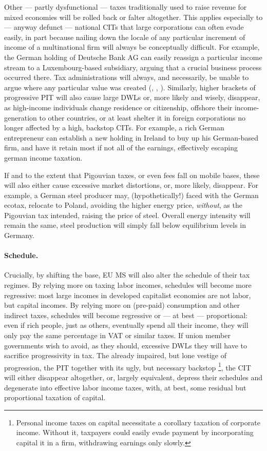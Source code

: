 \documentclass[11pt,a4paper,oneside]{article}
\begin{document}
Other --- partly dysfunctional --- taxes traditionally used to raise revenue for mixed economies will be rolled back or falter altogether.
This applies especially to --- anyway defunct --- national \glspl{CIT} that large corporations can often evade easily, in part because nailing down the locale of any particular increment of income of a multinational firm will always be conceptually difficult.
For example, the German holding of Deutsche Bank AG can easily reassign a particular income stream to a Luxembourg-based subsidiary, arguing that a crucial business process occurred there.
Tax administrations will always, and necessarily, be unable to argue where any particular value was created (\citealt{Ganghof2006}, \citealt{Ganghof}, \citealt[5]{Ganghof2007}).
Similarly, higher brackets of progressive \gls{PIT} will also cause large \glspl{DWL} or, more likely and wisely, disappear, as high-income individuals change residence or citizenship, offshore their income-generation to other countries, or at least shelter it in foreign corporations no longer affected by a high, backstop \glspl{CIT}.
For example, a rich German entrepreneur can establish a new holding in Ireland to buy up his German-based firm, and have it retain most if not all of the earnings, effectively escaping german income taxation.

If and to the extent that Pigouvian taxes, or even fees fall on mobile bases, these will also either cause excessive market distortions, or, more likely, disappear.
For example, a German steel producer may, (hypothetically!) faced with the German ecotax, relocate to Poland, avoiding the higher energy price, \emph{without}, as the Pigouvian tax intended, raising the price of steel.
Overall energy intensity will remain the same, steel production will simply fall below equilibrium levels in Germany.

\paragraph{Schedule.}
Crucially, by shifting the base, \gls{EU} \gls{MS} will also alter the schedule of their tax regimes.
By relying more on taxing labor incomes, schedules will become more regressive:
most large incomes in developed capitalist economies are not labor, but capital incomes.
By relying more on (pre-paid) consumption and other indirect taxes, schedules will become regressive or --- at best --- proportional:
even if rich people, just as others, eventually spend all their income, they will only pay the same percentage in \gls{VAT} or similar taxes.
If union member governments wish to avoid, as they should, excessive \glspl{DWL} they will have to sacrifice progressivity in tax.
The already impaired, but lone vestige of progression, the \gls{PIT} together with its ugly, but necessary backstop
\footnote{
	Personal income taxes on capital necessitate a corollary taxation of corporate income.
	Without it, taxpayers could easily evade payment by incorporating capital it in a firm, withdrawing earnings only slowly.
},
the \gls{CIT} will either disappear altogether, or, largely equivalent, depress their schedules and degenerate into effective labor income taxes, with, at best, some residual but proportional taxation of capital.
\end{document}
